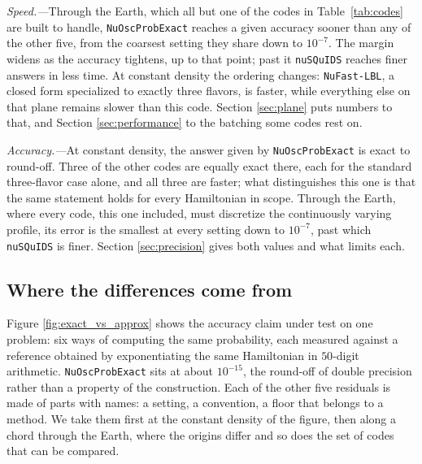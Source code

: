 \documentclass[final,5p,times,twocolumn,sort,compress]{elsarticle}
\begin{document}
\smallskip

\textit{Speed.---}Through the Earth, which all but one of the codes in Table~\ref{tab:codes} are built to handle, {\tt NuOscProbExact} reaches a given accuracy sooner than any of the other five, from the coarsest setting they share down to $10^{-7}$.  The margin widens as the accuracy tightens, up to that point; past it {\tt nuSQuIDS} reaches finer answers in less time.  At constant density the ordering changes: {\tt NuFast-LBL}, a closed form specialized to exactly three flavors, is faster, while everything else on that plane remains slower than this code.  Section \ref{sec:plane} puts numbers to that, and Section \ref{sec:performance} to the batching some codes rest on.

\smallskip

\textit{Accuracy.---}At constant density, the answer given by {\tt NuOscProbExact} is exact to round-off.  Three of the other codes are equally exact there, each for the standard three-flavor case alone, and all three are faster; what distinguishes this one is that the same statement holds for every Hamiltonian in scope.  Through the Earth, where every code, this one included, must discretize the continuously varying profile, its error is the smallest at every setting down to $10^{-7}$, past which {\tt nuSQuIDS} is finer.  Section \ref{sec:precision} gives both values and what limits each.


\subsection{Where the differences come from}
\label{sec:differences}

Figure \ref{fig:exact_vs_approx} shows the accuracy claim under test on one problem: six ways of computing the same probability, each measured against a reference obtained by exponentiating the same Hamiltonian in $50$-digit arithmetic.  {\tt NuOscProbExact} sits at about $10^{-15}$, the round-off of double precision rather than a property of the construction.  Each of the other five residuals is made of parts with names: a setting, a convention, a floor that belongs to a method.  We take them first at the constant density of the figure, then along a chord through the Earth, where the origins differ and so does the set of codes that can be compared.
\end{document}

